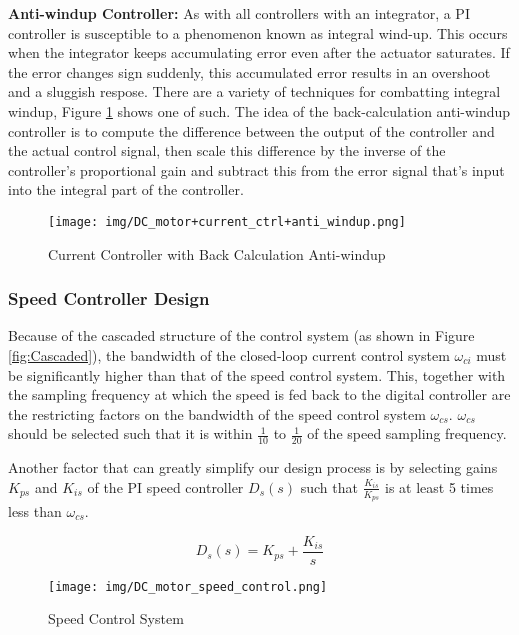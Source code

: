 \documentclass[a4paper]{article}
\begin{document}
\textbf{Anti-windup Controller: }As with all controllers with an integrator, a PI controller is susceptible to a phenomenon known as integral wind-up. 
This occurs when the integrator keeps accumulating error even after the actuator saturates. 
If the error changes sign suddenly, this accumulated error results in an overshoot and a sluggish respose. 
There are a variety of techniques for combatting integral windup, Figure \ref{fig:back_calculation} shows one of such. 
The idea of the back-calculation anti-windup controller is to compute the difference between the output of the controller and the actual control signal, 
then scale this difference by the inverse of the controller's proportional gain and subtract this from the error signal that's input 
into the integral part of the controller. 

\begin{figure}
        \centering
        \texttt{[image: img/DC\_motor+current\_ctrl+anti\_windup.png]}
        \caption{Current Controller with Back Calculation Anti-windup \cite{kim17}}
        \label{fig:back_calculation}
\end{figure}


\subsubsection{Speed Controller Design}
Because of the cascaded structure of the control system (as shown in Figure \ref{fig:Cascaded}), 
the bandwidth of the closed-loop current control system $\omega_{ci}$ must be significantly higher than that of the speed control system. 
This, together with the sampling frequency at which the speed is fed back to the digital controller are the restricting 
factors on the bandwidth of the speed control system $\omega_{cs}$. 
$\omega_{cs}$ should be selected such that it is within $\frac{1}{10}$ to $\frac{1}{20}$ of the speed sampling frequency. 

Another factor that can greatly simplify our design process is by selecting gains $K_{ps}$ and $K_{is}$ of the PI speed controller 
$D_{s}(s)$ such that $\frac{K_{is}}{K_{ps}}$ is at least 5 times less than $\omega_{cs}$. 

$$ D_{s}(s)= K_{ps} + \frac{K_{is}}{s} $$

\begin{figure}
        \centering
        \texttt{[image: img/DC\_motor\_speed\_control.png]}
        \caption{Speed Control System \cite{kim17}}
        \label{fig:DC_motor_speed_control}
\end{figure}
\end{document}
